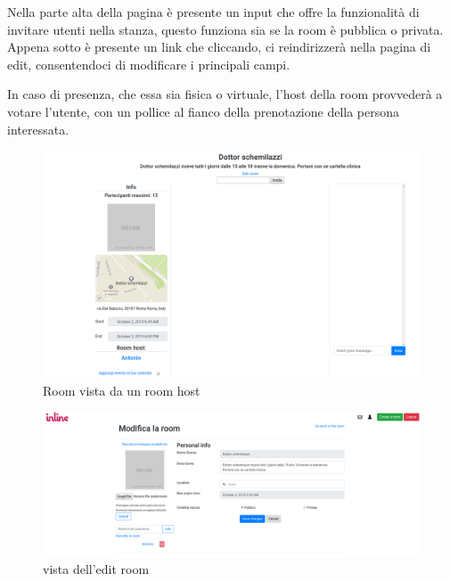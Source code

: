 	Nella parte alta della pagina è presente un input che offre la funzionalità di invitare utenti nella stanza, questo funziona sia se la room è pubblica o privata. Appena sotto è presente un link che cliccando, ci reindirizzerà nella pagina di edit, consentendoci di modificare i principali campi.
	
	In caso di presenza, che essa sia fisica o virtuale, l'host della room provvederà a votare l'utente, con un pollice al fianco della prenotazione della persona interessata.
	\begin{figure}[H]
		\includegraphics[width=\columnwidth]{room.png}
		\caption{Room vista da un room host}
	\end{figure}

	\begin{figure}[H]
		\includegraphics[width=\columnwidth]{./media/EditRoom.png}
		\caption{vista dell'edit room}
	\end{figure}

